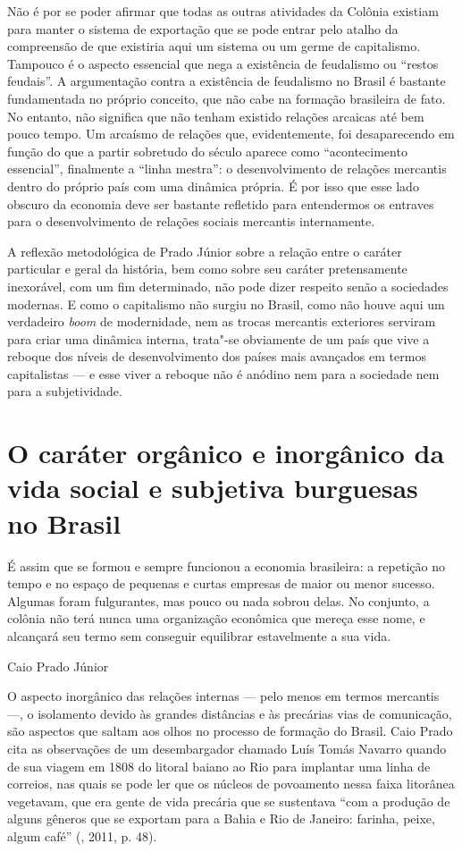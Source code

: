 Não é por se poder afirmar que todas as outras atividades da Colônia
existiam para manter o sistema de exportação que se pode entrar pelo
atalho da compreensão de que existiria aqui um sistema ou um germe de
capitalismo. Tampouco é o aspecto essencial que nega a existência de
feudalismo ou ``restos feudais''. A argumentação contra a existência de
feudalismo no Brasil é bastante fundamentada no próprio conceito, que
não cabe na formação brasileira de fato. No entanto, não significa que
não tenham existido relações arcaicas até bem pouco tempo. Um arcaísmo
de relações que, evidentemente, foi desaparecendo em função do que a
partir sobretudo do século  aparece como ``acontecimento essencial'',
finalmente a ``linha mestra'': o desenvolvimento de relações mercantis dentro do
próprio país com uma dinâmica própria. É por isso que esse lado obscuro
da economia deve ser bastante refletido para entendermos os entraves
para o desenvolvimento de relações sociais mercantis internamente.

A reflexão metodológica de Prado Júnior sobre a relação entre o caráter
particular e geral da história, bem como sobre seu caráter pretensamente
inexorável, com um fim determinado, não pode dizer respeito senão a
sociedades modernas. E como o capitalismo não surgiu no Brasil, como não
houve aqui um verdadeiro \emph{boom} de modernidade, nem as trocas
mercantis exteriores serviram para criar uma dinâmica interna, trata"-se
obviamente de um país que vive a reboque dos níveis de desenvolvimento
dos países mais avançados em termos capitalistas --- e esse viver a
reboque não é anódino nem para a sociedade nem para a subjetividade.

\section{O caráter orgânico e inorgânico da vida social e subjetiva burguesas no Brasil}

\epigraph{É assim que se formou e sempre funcionou a economia brasileira: a
repetição no tempo e no espaço de pequenas e curtas empresas de maior ou
menor sucesso. Algumas foram fulgurantes, mas pouco ou nada sobrou
delas. No conjunto, a colônia não terá nunca uma organização econômica
que mereça esse nome, e alcançará seu termo sem conseguir equilibrar
estavelmente a sua vida.}{Caio Prado Júnior}


O aspecto inorgânico das relações internas --- pelo menos em termos
mercantis ---, o isolamento devido às grandes distâncias e às precárias
vias de comunicação, são aspectos que saltam aos olhos no processo de
formação do Brasil. Caio Prado cita as observações de um desembargador
chamado Luís Tomás Navarro quando de sua viagem em 1808 do litoral
baiano ao Rio para implantar uma linha de correios, nas quais se pode
ler que os núcleos de povoamento nessa faixa litorânea vegetavam, que
era gente de vida precária que se sustentava ``com a produção de alguns
gêneros que se exportam para a Bahia e Rio de Janeiro: farinha, peixe,
algum café'' (, 2011, p. 48).

